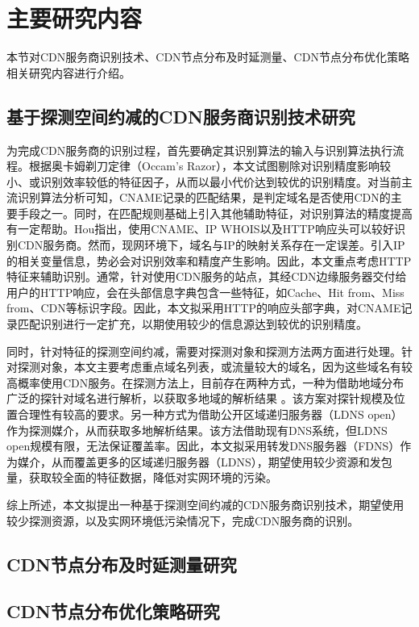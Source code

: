 
\section{主要研究内容}
本节对CDN服务商识别技术、CDN节点分布及时延测量、CDN节点分布优化策略相关研究内容进行介绍。


\subsection{基于探测空间约减的CDN服务商识别技术研究}

为完成CDN服务商的识别过程，首先要确定其识别算法的输入与识别算法执行流程。根据奥卡姆剃刀定律（Occam's Razor），本文试图剔除对识别精度影响较小、或识别效率较低的特征因子，从而以最小代价达到较优的识别精度。对当前主流识别算法分析可知，CNAME记录的匹配结果\cite{Huang2008,Adhikari2014,Guo2018}，是判定域名是否使用CDN的主要手段之一。同时，在匹配规则基础上引入其他辅助特征，对识别算法的精度提高有一定帮助。Hou\cite{Hou2021}指出，使用CNAME、IP WHOIS以及HTTP响应头可以较好识别CDN服务商。然而，现网环境下，域名与IP的映射关系存在一定误差\cite{Ma2021}。引入IP的相关变量信息，势必会对识别效率和精度产生影响。因此，本文重点考虑HTTP特征来辅助识别。通常，针对使用CDN服务的站点，其经CDN边缘服务器交付给用户的HTTP响应，会在头部信息字典包含一些特征，如Cache、Hit from、Miss from、CDN等标识字段。因此，本文拟采用HTTP的响应头部字典，对CNAME记录匹配识别进行一定扩充，以期使用较少的信息源达到较优的识别精度。


同时，针对特征的探测空间约减，需要对探测对象和探测方法两方面进行处理。针对探测对象，本文主要考虑重点域名列表，或流量较大的域名，因为这些域名有较高概率使用CDN服务。在探测方法上，目前存在两种方式，一种为借助地域分布广泛的探针对域名进行解析，以获取多地域的解析结果
。该方案对探针规模及位置合理性有较高的要求。另一种方式为借助公开区域递归服务器（LDNS open）作为探测媒介\cite{Huang2008}，从而获取多地解析结果。该方法借助现有DNS系统，但LDNS open规模有限，无法保证覆盖率。因此，本文拟采用转发DNS服务器（FDNS）作为媒介，从而覆盖更多的区域递归服务器（LDNS），期望使用较少资源和发包量，获取较全面的特征数据，降低对实网环境的污染。

综上所述，本文拟提出一种基于探测空间约减的CDN服务商识别技术，期望使用较少探测资源，以及实网环境低污染情况下，完成CDN服务商的识别。



\subsection{CDN节点分布及时延测量研究}








\subsection{CDN节点分布优化策略研究}
 

